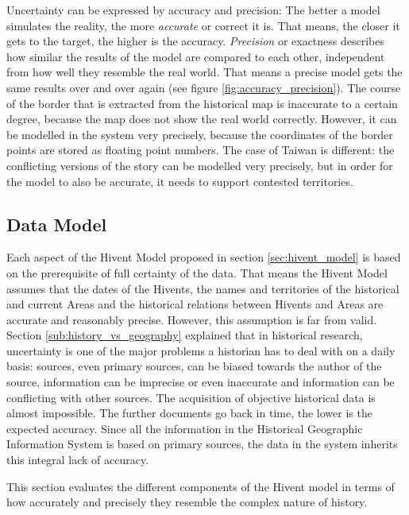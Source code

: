 Uncertainty can be expressed by accuracy and precision: The better a model simulates the reality, the more \emph{accurate} or correct it is. That means, the closer it gets to the target, the higher is the accuracy. \emph{Precision} or exactness describes how similar the results of the model are compared to each other, independent from how well they resemble the real world. That means a precise model gets the same results over and over again (see figure \ref{fig:accuracy_precision}).
The course of the border that is extracted from the historical map is inaccurate to a certain degree, because the map does not show the real world correctly. However, it can be modelled in the system very precisely, because the coordinates of the border points are stored as floating point numbers.
The case of Taiwan is different: the conflicting versions of the story can be modelled very precisely, but in order for the model to also be accurate, it needs to support contested territories.



\subsection{Data Model} %
\label{sub:data_model}

Each aspect of the Hivent Model proposed in section \ref{sec:hivent_model} is based on the prerequisite of full certainty of the data. That means the Hivent Model assumes that the dates of the Hivents, the names and territories of the historical and current Areas and the historical relations between Hivents and Areas are accurate and reasonably precise. However, this assumption is far from valid. Section \ref{sub:history_vs_geography} explained that in historical research, uncertainty is one of the major problems a historian has to deal with on a daily basis: sources, even primary sources, can be biased towards the author of the source, information can be imprecise or even inaccurate and information can be conflicting with other sources. The acquisition of objective historical data is almost impossible. The further documents go back in time, the lower is the expected accuracy. Since all the information in the Historical Geographic Information System is based on primary sources, the data in the system inherits this integral lack of accuracy.

This section evaluates the different components of the Hivent model in terms of how accurately and precisely they resemble the complex nature of history.

